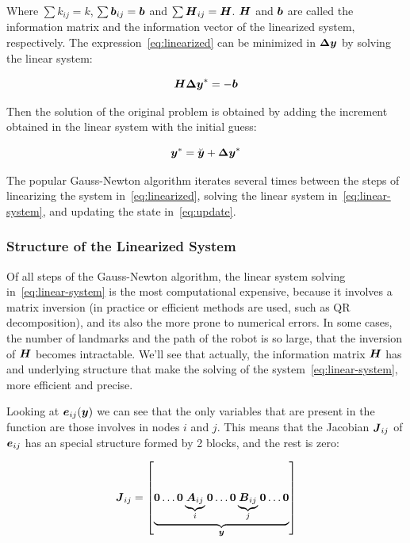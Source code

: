 Where $\sum k_{ij} = k$, $\sum \boldsymbol{b}_{ij} = \boldsymbol{b}$ and $\sum \boldsymbol{H}_{ij} = \boldsymbol{H}$. $\boldsymbol{H}$ and $\boldsymbol{b}$ are called the information matrix and the information vector of the linearized system, respectively. The expression~\eqref{eq:linearized} can be minimized in $\boldsymbol{\Delta y}$ by solving the linear system:

\begin{equation}
\boldsymbol{H \Delta y}^* = -\boldsymbol{b}
\label{eq:linear-system}
\end{equation}

Then the solution of the original problem is obtained by adding the increment obtained in the linear system with the initial guess:

\begin{equation}
\boldsymbol{y}^* = \breve{\boldsymbol{y}}+ \boldsymbol{\Delta y}^*
\label{eq:update}
\end{equation}

The popular Gauss-Newton algorithm iterates several times between the steps of linearizing the system in~\eqref{eq:linearized}, solving the linear system in~\eqref{eq:linear-system}, and updating the state in~\eqref{eq:update}.  

\subsubsection{Structure of the Linearized System}

Of all steps of the Gauss-Newton algorithm, the linear system solving in~\eqref{eq:linear-system} is the most computational expensive, because it involves a matrix inversion (in practice or efficient methods are used, such as QR decomposition), and its also the more prone to numerical errors. In some cases, the number of landmarks and the path of the robot is so large, that the inversion of $\boldsymbol{H}$ becomes intractable. We'll see that actually, the information matrix $\boldsymbol{H}$ has and underlying structure that make the solving of the system~\eqref{eq:linear-system}, more efficient and precise.


Looking at $\boldsymbol{e}_{ij}(\boldsymbol{y})$ we can see that the only variables that are present in the function are those involves in nodes $i$ and $j$. This means that the Jacobian $\boldsymbol{J}_{ij}$ of $\boldsymbol{e}_{ij}$ has an special structure formed by 2 blocks, and the rest is zero:

\begin{equation}
\boldsymbol{J}_{ij} = \left[ \underbrace{\boldsymbol{0} \dots \boldsymbol{0} 
    \underbrace{\boldsymbol{A}_{ij}}_{i} \boldsymbol{0} \dots \boldsymbol{0} 
    \underbrace{\boldsymbol{B}_{ij}}_{j}
    \boldsymbol{0} \dots \boldsymbol{0}}_{\boldsymbol{y}} \right] 
\end{equation}

